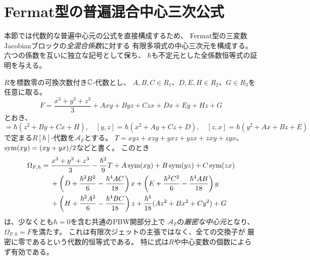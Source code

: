 \section{Fermat型の普遍混合中心三次公式}
\label{sec:pg-fermat-mixed-universal}
本節では代数的な普遍中心元の公式を直接構成するため、
Fermat型の三変数Jacobianブロックの\emph{全混合係数}に対する
有限多項式の中心三次元を構成する。
六つの係数を互いに独立な記号として保ち、
$\hbar$も不定元とした全係数恒等式の証明を与える。

\begin{theorem}[普遍Fermat混合中心三次元]
\label{thm:pg-fermat-mixed-universal}
$R$を標数零の可換次数付き$\mathbb C$-代数とし、
$A,B,C\in R_1$、$D,E,H\in R_2$、$G\in R_3$を任意に取る。
\begin{equation}
 F=\frac{x^3+y^3+z^3}{3}
   +Axy+Byz+Czx+Dx+Ey+Hz+G
 \label{eq:pg-fermat-mixed-F}
\end{equation}
とおき、
\begin{equation}
 [x,y]=\hbar(z^2+By+Cx+H),\quad
 [y,z]=\hbar(x^2+Ay+Cz+D),\quad
 [z,x]=\hbar(y^2+Ax+Bz+E)
 \label{eq:pg-fermat-mixed-rel}
\end{equation}
で定まる$R[\hbar]$-代数を$\mathcal A_F$とする。
$T=xyz+xzy+yxz+yzx+zxy+zyx$、
$\operatorname{sym}(xy)=(xy+yx)/2$などと書く。
このとき
\begin{align}
\Omega_{F,\hbar}={}&
 \frac{x^3+y^3+z^3}{3}-\frac{\hbar^2}{9}T
 +A\operatorname{sym}(xy)+B\operatorname{sym}(yz)+C\operatorname{sym}(zx)\notag\\
 &+\left(D+\frac{\hbar^2B^2}{6}-\frac{\hbar^4AC}{18}\right)x
 +\left(E+\frac{\hbar^2C^2}{6}-\frac{\hbar^4AB}{18}\right)y\notag\\
 &+\left(H+\frac{\hbar^2A^2}{6}-\frac{\hbar^4BC}{18}\right)z
 +\frac{\hbar^4}{18}(Az^2+Bx^2+Cy^2)+G
 \label{eq:pg-fermat-mixed-Omega}
\end{align}
は、少なくとも$\hbar=0$を含む共通のPBW開部分上で
$\mathcal A_F$の\emph{厳密な中心元}となり、
$\Omega_{F,0}=F$を満たす。
これは有限次ジェットの主張ではなく、全ての交換子が
厳密に零であるという代数的恒等式である。
特に式は$R$や中心変数の個数によらず有効である。
\end{theorem}

